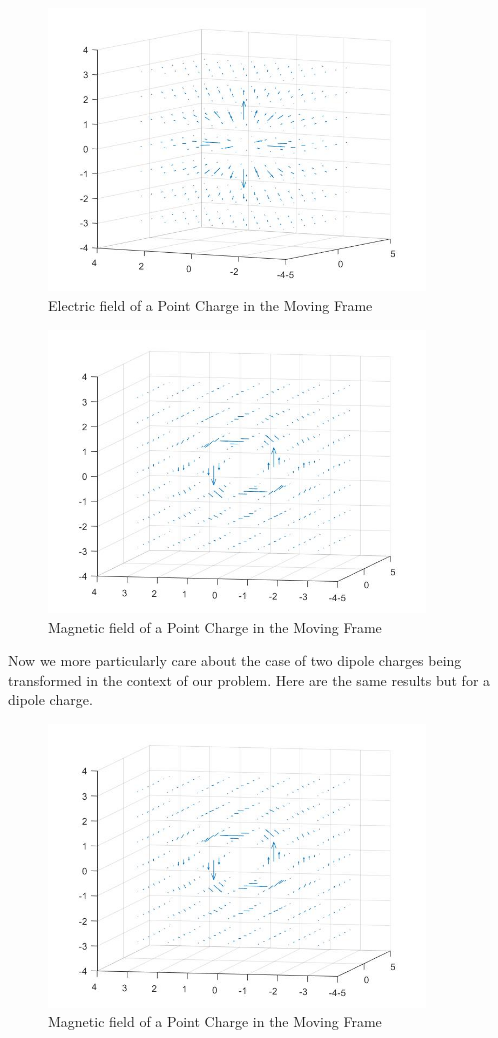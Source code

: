 \documentclass{article}
\begin{document}
\begin{figure}[h!]
  \includegraphics[width=100mm,scale=.5]{electrictransformed.jpg}
  \caption{Electric field of a Point Charge in the Moving Frame}
  \label{fig:etransformed}
\end{figure}

\begin{figure}[h!]
  \includegraphics[width=100mm,scale=.5]{magnetictransformed.jpg}
  \caption{Magnetic field of a Point Charge in the Moving Frame}
  \label{fig:btransformed}
\end{figure}

Now we more particularly care about the case of two dipole charges being transformed in the context of our problem. Here  are the same results but for a dipole charge.

\begin{figure}[h!]
  \includegraphics[width=100mm,scale=.5]{magnetictransformed.jpg}
  \caption{Magnetic field of a Point Charge in the Moving Frame}
  \label{fig:btransformed}
\end{figure}
\end{document}
